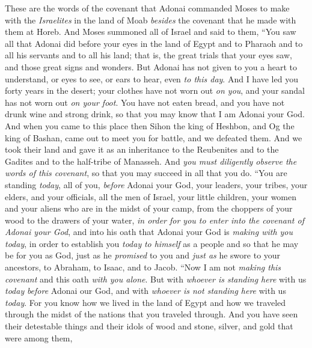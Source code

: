 \begin{biblechapter} %
  These are the words of the covenant that Adonai commanded Moses to make with the \textit{Israelites} in the land of Moab \textit{besides} the covenant that he made with them at Horeb.
\verse And Moses summoned all of Israel and said to them, “You saw all that Adonai did before your eyes in the land of Egypt and to Pharaoh and to all his servants and to all his land;
\verse that is, the great trials that your eyes saw, and those great signs and wonders.
\verse But Adonai has not given to you a heart to understand, or eyes to see, or ears to hear, even \textit{to this day}.
\verse And I have led you forty years in the desert; your clothes have not worn out \textit{on you}, and your sandal has not worn out \textit{on your foot}.
\verse You have not eaten bread, and you have not drunk wine and strong drink, so that you may know that I am Adonai your God.
\verse And when you came to this place then Sihon the king of Heshbon, and Og the king of Bashan, came out to meet you for battle, and we defeated them.
\verse And we took their land and gave it as an inheritance to the Reubenites and to the Gadites and to the half-tribe of Manasseh.
\verse And \textit{you must diligently observe the words of this covenant}, so that you may succeed in all that you do.
\verse “You are standing \textit{today}, all of you, \textit{before} Adonai your God, your leaders, your tribes, your elders, and your officials, all the men of Israel,
\verse your little children, your women and your aliens who are in the midst of your camp, from the choppers of your wood to the drawers of your water,
\verse \textit{in order for you to enter into the covenant of Adonai your God}, and into his oath that Adonai your God is \textit{making with you} \textit{today},
\verse in order to establish you \textit{today} \textit{to himself} as a people and so that he may be for you as God, just as he \textit{promised} to you and \textit{just as} he swore to your ancestors, to Abraham, to Isaac, and to Jacob.
\verse “Now I am not \textit{making this covenant} and this oath \textit{with you alone}.
\verse But with \textit{whoever is standing here} with us \textit{today} \textit{before} Adonai our God, and with \textit{whoever is not standing here} with us \textit{today}.
\verse For you know how we lived in the land of Egypt and how we traveled through the midst of the nations that you traveled through.
\verse And you have seen their detestable things and their idols of wood and stone, silver, and gold that were among them,

\end{biblechapter}
